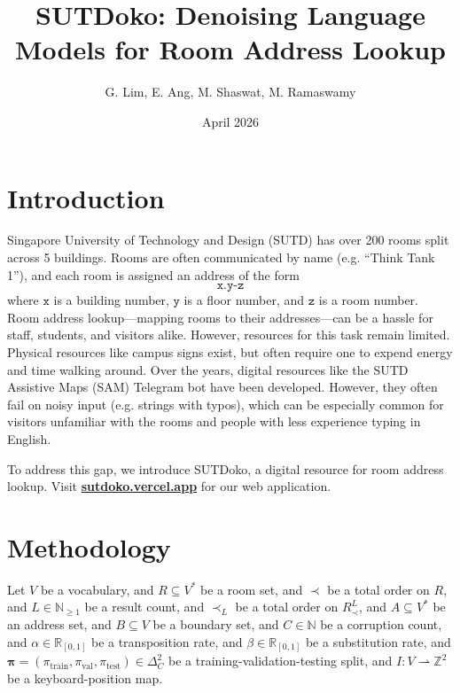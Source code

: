 \documentclass{article}
\title{SUTDoko: Denoising Language Models for Room Address Lookup}
\author{G. Lim, E. Ang, M. Shaswat, M. Ramaswamy}
\date{April 2026}
\theoremstyle{definition}
\let\oldhref\href
\renewcommand{\href}[2]{\oldhref{#1}{\textbf{#2}}}
\newcommand{\N}{\mathbb{N}}
\newcommand{\R}{\mathbb{R}}
\newcommand{\Z}{\mathbb{Z}}
\begin{document}
\maketitle

\section{Introduction}

Singapore University of Technology and Design (SUTD) has over 200 rooms split across 5 buildings.
Rooms are often communicated by name (e.g. ``Think Tank 1''),
and each room is assigned an address of the form
$$\texttt{x.y-z}$$
where $\texttt{x}$ is a building number,
$\texttt{y}$ is a floor number,
and $\texttt{z}$ is a room number.
Room address lookup---mapping rooms to their addresses---can be a hassle for staff, students, and visitors alike.
However, resources for this task remain limited.
Physical resources like campus signs exist,
but often require one to expend energy and time walking around.
Over the years,
digital resources like
the SUTD Assistive Maps (SAM) Telegram bot
\citep{sam}
have been developed.
However, they often fail on noisy input (e.g. strings with typos),
which can be especially common for
visitors unfamiliar with the rooms
and people with less experience typing in English.

To address this gap,
we introduce SUTDoko,
a digital resource for room address lookup.
Visit
\href{https://sutdoko.vercel.app}{sutdoko.vercel.app}
for our web application.

\newpage

\section{Methodology}

Let $V$ be a vocabulary,
and $R\subseteq V^{*}$ be a room set,
and $\prec$ be a total order on $R$,
and $L\in\N_{\geq 1}$ be a result count,
and $\prec_{L}$ be a total order on $R_{\prec}^{L}$,
and $A\subseteq V^{*}$ be an address set,
and $B\subseteq V$ be a boundary set,
and $C\in\N$ be a corruption count,
and $\alpha\in\R_{[0,1]}$ be a transposition rate,
and $\beta\in\R_{[0,1]}$ be a substitution rate,
and $\bm{\pi}=(\pi_\mathrm{train},\pi_\mathrm{val},\pi_\mathrm{test})\in\Delta_{C}^{2}$ be a training-validation-testing split,
and $I:V\rightharpoonup\Z^{2}$ be a keyboard-position map.
\end{document}
